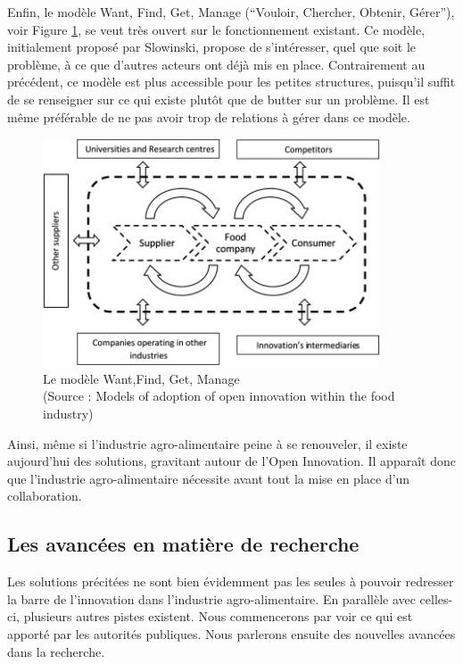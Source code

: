 \documentclass[a4paper,12pt]{report}
\begin{document}
			Enfin, le modèle Want, Find, Get, Manage (“Vouloir, Chercher, Obtenir, Gérer”), voir Figure \ref{ImageWFGM}, se veut très ouvert sur le fonctionnement existant. Ce modèle, initialement proposé par Slowinski\cite{WFGM}, propose de s’intéresser, quel que soit le problème, à ce que d’autres acteurs ont déjà mis en place. Contrairement au précédent, ce modèle est plus accessible pour les petites structures, puisqu’il suffit de se renseigner sur ce qui existe plutôt que de butter sur un problème. Il est même préférable de ne pas avoir trop de relations à gérer dans ce modèle.

			\begin{figure}[!h]
			\centering
			\includegraphics[width=10cm]{Illustrations/Schema_WFGM.jpg}
			\caption{Le modèle Want,Find, Get, Manage \\(Source : Models of adoption of open innovation within the food industry\cite{OpenInnovation})}
			\label{ImageWFGM}
			\end{figure}
			
			Ainsi, même si l’industrie agro-alimentaire peine à se renouveler, il existe aujourd’hui des solutions, gravitant autour de l’Open Innovation. Il apparaît donc que l’industrie agro-alimentaire nécessite avant tout la mise en place d’un collaboration.
			
		\subsection{Les avancées en matière de recherche}
			Les solutions précitées ne sont bien évidemment pas les seules à pouvoir redresser la barre de l’innovation dans l’industrie agro-alimentaire. En parallèle avec celles-ci, plusieurs autres pistes existent. Nous commencerons par voir ce qui est apporté par les autorités publiques. Nous parlerons ensuite des nouvelles avancées dans la recherche.
			
\end{document}
